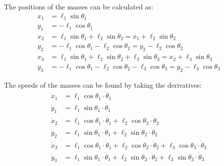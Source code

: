 \documentclass[letterpaper,8pt]{article}
\begin{document}
The positions of the masses can be calculated as:
\begin{align*}
x_1 &= \ell_1 \sin \theta_1  \\
y_1 &= -\ell_1 \cos \theta_1 \\
x_2 &= \ell_1 \sin \theta_1 + \ell_2 \sin \theta_2 
     = x_1 + \ell_2 \sin \theta_2 \\
y_2 &= -\ell_1 \cos \theta_1 - \ell_2 \cos \theta_2
     = y_2 - \ell_2 \cos \theta_2 \\
x_3 &= \ell_1 \sin \theta_1 + \ell_2 \sin \theta_2 + \ell_3 \sin \theta_3 
     = x_2 + \ell_3 \sin \theta_3 \\
y_3 &= -\ell_1 \cos \theta_1 - \ell_2 \cos \theta_2 - \ell_3 \cos \theta_3 
     = y_2 - \ell_3 \cos \theta_3
\end{align*}

The speeds of the masses can be found by taking the derivatives:
\begin{align*}
\dot{x}_1 &= \ell_1 \cos \theta_1 \cdot \dot{\theta}_1 \\
\dot{y}_1 &= \ell_1 \sin \theta_1 \cdot \dot{\theta}_1 \\
\dot{x}_2 &= \ell_1 \cos \theta_1 \cdot \dot{\theta}_1 + \ell_2 \cos \theta_2 \cdot \dot{\theta}_2 \\
\dot{y}_2 &= \ell_1 \sin \theta_1 \cdot \dot{\theta}_1 + \ell_2 \sin \theta_2 \cdot \dot{\theta}_2 \\
\dot{x}_3 &= \ell_1 \cos \theta_1 \cdot \dot{\theta}_1 + \ell_2 \cos \theta_2 \cdot \dot{\theta}_2 + \ell_3 \cos \theta_3 \cdot \dot{\theta}_3 \\
\dot{y}_3 &= \ell_1 \sin \theta_1 \cdot \dot{\theta}_1 + \ell_2 \sin \theta_2 \cdot \dot{\theta}_2 + \ell_3 \sin \theta_3 \cdot \dot{\theta}_3
\end{align*}
\end{document}
